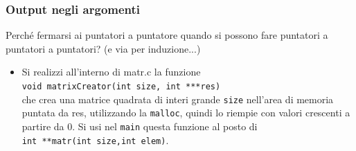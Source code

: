 \documentclass{beamer}
\begin{document}
\begin{frame}
\frametitle{Output negli argomenti}
Perché fermarsi ai puntatori a puntatore quando si possono fare puntatori a puntatori a puntatori? (e via per induzione...)
\begin{itemize}
 \item Si realizzi all'interno di matr.c la funzione\\ \texttt{void matrixCreator(int size, int ***res)} \\che crea una matrice quadrata di interi grande \texttt{size} nell'area di memoria puntata da res, utilizzando la \texttt{malloc}, quindi lo riempie con valori crescenti a partire da 0. Si usi nel \texttt{main} questa funzione al posto di \\ \texttt{int **matr(int size,int elem)}.
\end{itemize}
\end{frame}
\end{document}
